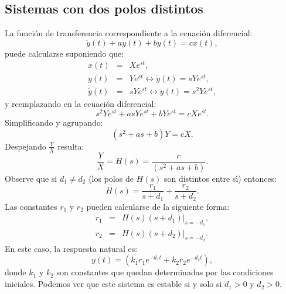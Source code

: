 \subsection{Sistemas con dos polos distintos}

La funci\'{o}n de transferencia correspondiente a la ecuaci\'{o}n diferencial:
\begin{equation}
	\ddot{y}\left( t\right) +a\dot{y}\left( t\right) +by\left( t\right) = cx\left( t\right) ,
\end{equation}
puede calcularse suponiendo que:
\begin{eqnarray}
	x\left( t\right)        &=& X e^{st}, \\
	y\left( t\right)        &=& Y e^{st} \longleftrightarrow \dot{y}\left( t\right) = s Y e^{st}, \\
	\dot{y}\left( t\right)  &=& s Y e^{st} \longleftrightarrow \ddot{y}\left(t\right) = s^{2} Y e^{st},
\end{eqnarray}
y reemplazando en la ecuaci\'{o}n diferencial:
\begin{equation}
	s^{2} Y e^{st} + a s Y e^{st} + b Y e^{st} = c X e^{st}.
\end{equation}
Simplificando y agrupando:
\begin{equation}
	\left( s^{2}+as+b\right) Y = c X.
\end{equation}
Despejando $\frac{Y}{X}$ resulta: 
\begin{equation}
	\frac{Y}{X} = H\left( s\right) = \frac{c}{\left( s^{2}+as+b\right) }.
\end{equation}
Observe que si $d_{1}\neq d_{2}$ (los polos de $H(s)$ son distintos entre s\'{\i}) entonces: 
\begin{equation}
	H\left( s\right) = \frac{r_{1}}{s+d_{1}} + \frac{r_{2}}{s+d_{2}}.
\end{equation}
Las constantes $r_{1}$ y $r_{2}$ pueden calcularse de la siguiente forma:
\begin{eqnarray}
	r_{1} &=& \left. H(s) (s+d_{1}) \right|_{s=-d_{1}}, \\
	r_{2} &=& \left. H(s) (s+d_{2}) \right|_{s=-d_{2}}.
\end{eqnarray}
En este caso, la respuesta natural es: 
\begin{equation}
	y\left( t\right) = \left( k_{1} r_{1} e^{-d_{1}t} + k_{2} r_{2} e^{-d_{2}t}\right) ,
\end{equation}
donde $k_{1}$ y $k_{2}$ son constantes que quedan determinadas por las condiciones iniciales. Podemos ver que este sistema es estable si y solo si $d_{1} > 0$ y $d_{2} > 0$.

